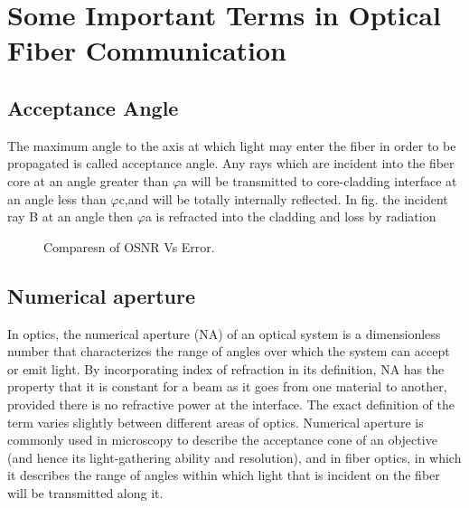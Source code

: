 \documentclass[12pt]{report}
\begin{document}
	\section{Some Important Terms in Optical Fiber Communication }
	\subsection*{ Acceptance Angle}
	The maximum angle to the axis at which light may enter the fiber in order to be propagated is called acceptance angle. 
	Any rays which are incident into the fiber core at an angle greater than $\varphi$a will be transmitted to core-cladding interface at an angle less than $\varphi$c,and will be totally internally reflected. 
	In fig. the incident ray B at an angle then $\varphi$a is refracted into the cladding and loss by radiation
	\begin{figure}[htbp]
		\caption{Comparesn of OSNR Vs Error.}
		\label{fig1}
	\end{figure}
	
	\subsection*{Numerical aperture }
	In optics, the numerical aperture (NA) of an optical system is a dimensionless number that characterizes the range of angles over which the system can accept or emit light. By incorporating index of refraction in its definition, NA has the property that it is constant for a beam as it goes from one material to another, provided there is no refractive power at the interface. The exact definition of the term varies slightly between different areas of optics. Numerical aperture is commonly used in microscopy to describe the acceptance cone of an objective (and hence its light-gathering ability and resolution), and in fiber optics, in which it describes the range of angles within which light that is incident on the fiber will be transmitted along it. 
	
\end{document}
